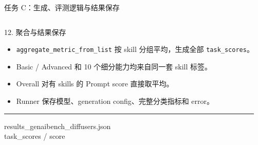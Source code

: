 \documentclass[aspectratio=169,10pt]{beamer}
\begin{document}
\begin{frame}{任务 C：生成、评测逻辑与结果保存}
\begin{columns}[T,onlytextwidth]
      \begin{block}{12. 聚合与结果保存}
        \begin{minipage}[c][5.05cm][c]{\linewidth}
          \begin{itemize}\scriptsize
            \item \texttt{aggregate\_metric\_from\_list} 按 skill 分组平均，生成全部 \texttt{task\_scores}。
            \item Basic / Advanced 和 10 个细分能力均来自同一套 skill 标签。
            \item Overall 对有 skills 的 Prompt score 直接取平均。
            \item Runner 保存模型、generation config、完整分类指标和 error。
          \end{itemize}
          \vspace{0.45em}
          \color{T2IGray}\rule{\linewidth}{0.35pt}\par\vspace{0.3em}
          \scriptsize\ttfamily
          results\_genaibench\_diffusers.json\\
          task\_scores / score
        \end{minipage}
      \end{block}
  \end{columns}
\end{frame}
\end{document}
